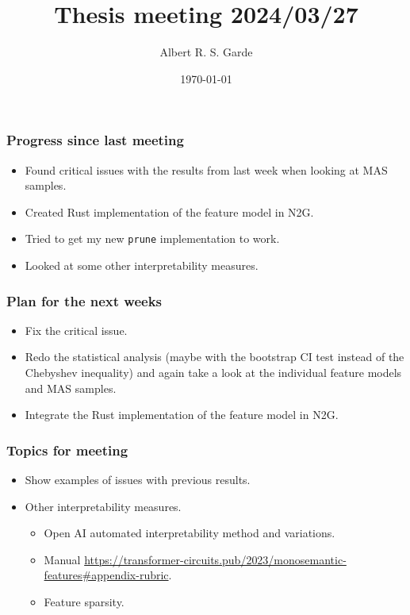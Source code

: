 \documentclass[aspectratio=169]{beamer}
\title{Thesis meeting 2024/03/27}
\author{Albert R. S. Garde}
\date{\today}
\begin{document}
\frame{
	\maketitle
}

\begin{frame}[fragile=singleslide]
	\frametitle{Progress since last meeting}
    \begin{itemize}
        \item Found critical issues with the results from last week when looking at MAS samples.
        \item Created Rust implementation of the feature model in N2G.
        \item Tried to get my new \verb|prune| implementation to work.
        \item Looked at some other interpretability measures.
    \end{itemize}
\end{frame}
\begin{frame}[fragile=singleslide]
    \frametitle{Plan for the next weeks}
    \begin{itemize}
        \item Fix the critical issue.
        \item Redo the statistical analysis 
        (maybe with the bootstrap CI test instead of the Chebyshev inequality) 
        and again take a look at the individual feature models and MAS samples.
        \item Integrate the Rust implementation of the feature model in N2G.
    \end{itemize}
\end{frame}
\begin{frame}[fragile=singleslide]
    \frametitle{Topics for meeting}
    \begin{itemize}
        \item Show examples of issues with previous results.
        \item Other interpretability measures.
        \begin{itemize}
            \item Open AI automated interpretability method and variations.
            \item Manual \url{https://transformer-circuits.pub/2023/monosemantic-features#appendix-rubric}.
            \item Feature sparsity.
        \end{itemize}
    \end{itemize}
\end{frame}
\end{document}
